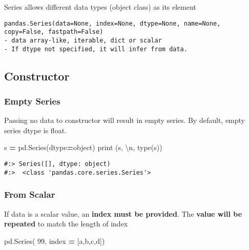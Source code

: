 \documentclass[
]{book}
\newenvironment{Shaded}{\begin{snugshade}}{\end{snugshade}}
\newcommand{\BuiltInTok}[1]{#1}
\newcommand{\CharTok}[1]{\textcolor[rgb]{0.5,0.5,0.5}{#1}}
\newcommand{\DecValTok}[1]{\textcolor[rgb]{0.06,0.06,0.06}{#1}}
\newcommand{\NormalTok}[1]{#1}
\newcommand{\OperatorTok}[1]{\textcolor[rgb]{0.43,0.43,0.43}{\textbf{#1}}}
\newcommand{\StringTok}[1]{\textcolor[rgb]{0.5,0.5,0.5}{#1}}
\begin{document}
Series allows different data types (object class) as its element

\begin{verbatim}
pandas.Series(data=None, index=None, dtype=None, name=None, copy=False, fastpath=False)
- data array-like, iterable, dict or scalar
- If dtype not specified, it will infer from data.
\end{verbatim}

\hypertarget{constructor-9}{%
\subsection{Constructor}\label{constructor-9}}

\hypertarget{empty-series}{%
\subsubsection{Empty Series}\label{empty-series}}

Passing no data to constructor will result in empty series. By default, empty series dtype is float.

\begin{Shaded}
\begin{Highlighting}[]
\NormalTok{s }\OperatorTok{=}\NormalTok{ pd.Series(dtype}\OperatorTok{=}\StringTok{\textquotesingle{}object\textquotesingle{}}\NormalTok{)}
\BuiltInTok{print}\NormalTok{ (s, }\StringTok{\textquotesingle{}}\CharTok{\textbackslash{}n}\StringTok{\textquotesingle{}}\NormalTok{,}
       \BuiltInTok{type}\NormalTok{(s))}
\end{Highlighting}
\end{Shaded}

\begin{verbatim}
#:> Series([], dtype: object) 
#:>  <class 'pandas.core.series.Series'>
\end{verbatim}

\hypertarget{from-scalar}{%
\subsubsection{From Scalar}\label{from-scalar}}

If data is a scalar value, an \textbf{index must be provided}. The \textbf{value will be repeated} to match the length of index

\begin{Shaded}
\begin{Highlighting}[]
\NormalTok{pd.Series( }\DecValTok{99}\NormalTok{, index }\OperatorTok{=}\NormalTok{ [}\StringTok{\textquotesingle{}a\textquotesingle{}}\NormalTok{,}\StringTok{\textquotesingle{}b\textquotesingle{}}\NormalTok{,}\StringTok{\textquotesingle{}c\textquotesingle{}}\NormalTok{,}\StringTok{\textquotesingle{}d\textquotesingle{}}\NormalTok{])}
\end{Highlighting}
\end{Shaded}
\end{document}
